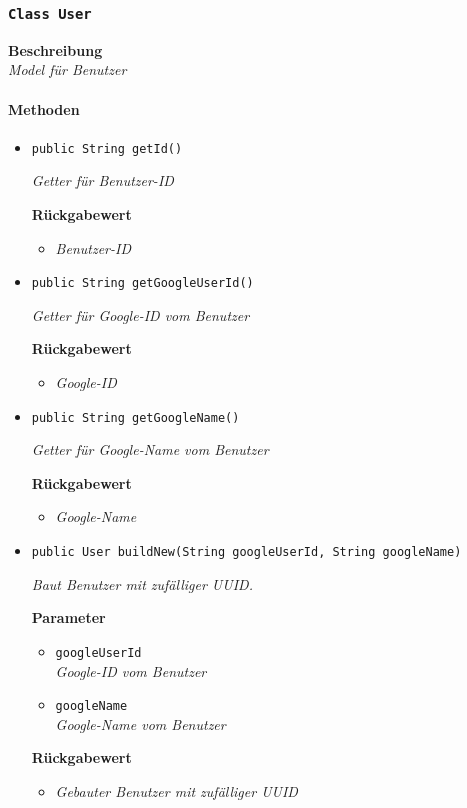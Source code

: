      \subsubsection{\texttt{Class User}}
     \textbf{Beschreibung} \\
     \textit{Model für Benutzer}
     \paragraph*{Methoden}
     \begin{itemize}
     	\item{\texttt{public String getId()}}
     	
     	\textit{Getter für Benutzer-ID}
     	
     	\textbf{Rückgabewert} 
     	\begin{itemize}
     		\item\textit{Benutzer-ID}
     	\end{itemize}
     
     \item{\texttt{public String getGoogleUserId()}}
     	
     	\textit{Getter für Google-ID vom Benutzer}
     	
     	\textbf{Rückgabewert}
     	\begin{itemize}
     		\item\textit{Google-ID}
     	\end{itemize}
     
     \item{\texttt{public String getGoogleName()}}
     	
     	\textit{Getter für Google-Name vom Benutzer}
     	
     	\textbf{Rückgabewert}
     	\begin{itemize}
     		\item\textit{Google-Name}
     	\end{itemize}
     
     \item{\texttt{public User buildNew(String googleUserId, String googleName)}}
     	
     	\textit{Baut Benutzer mit zufälliger UUID.}
     	
     	\textbf{Parameter}
     	\begin{itemize}
     		\item\texttt{googleUserId}\\
     		\textit{Google-ID vom Benutzer}
     		\item\texttt{googleName}\\
     		\textit{Google-Name vom Benutzer}
     	\end{itemize}
     	
     	\textbf{Rückgabewert}
     	\begin{itemize}
     		\item\textit{Gebauter Benutzer mit zufälliger UUID}
     	\end{itemize}
     \end{itemize}
